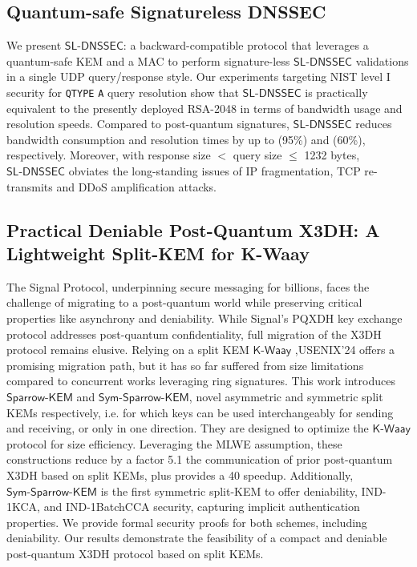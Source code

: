 \documentclass[11pt]{article}
\theoremstyle{definition}
\theoremstyle{remark}
\theoremstyle{plain}
\begin{document}
\subsection{\cite{10.1145/3708821.3710837} Quantum-safe Signatureless DNSSEC}
We present $\mathsf{SL \text{-} DNSSEC}$: a backward-compatible protocol that leverages a quantum-safe KEM and a MAC to perform signature-less $\mathsf{SL \text{-} DNSSEC}$ validations in a single UDP query/response style. Our experiments targeting NIST level I security for \texttt{QTYPE} \texttt{A} query resolution show that $\mathsf{SL \text{-} DNSSEC}$ is practically equivalent to the presently deployed RSA-2048 in terms of bandwidth usage and resolution speeds. Compared to post-quantum signatures, $\mathsf{SL \text{-} DNSSEC}$ reduces bandwidth consumption and resolution times by up to (95\%) and (60\%), respectively. Moreover, with response size $<$ query size $\le$ 1232 bytes, $\mathsf{SL \text{-} DNSSEC}$ obviates the long-standing issues of IP fragmentation, TCP re-transmits and DDoS amplification attacks.

\subsection{\cite{10.1145/3708821.3736192} Practical Deniable Post-Quantum X3DH: A Lightweight Split-KEM for K-Waay}
The Signal Protocol, underpinning secure messaging for billions, faces the challenge of migrating to a post-quantum world while preserving critical properties like asynchrony and deniability. While Signal's PQXDH key exchange protocol addresses post-quantum confidentiality, full migration of the X3DH protocol remains elusive. Relying on a split KEM $\mathsf{K\text{-}Waay}$ ,USENIX'24 \cite{collins2024k} offers a promising migration path, but it has so far suffered from size limitations compared to concurrent works leveraging ring signatures.
This work introduces $\mathsf{Sparrow \text{-} KEM}$ and $\mathsf{Sym \text{-} Sparrow \text{-}KEM}$, novel asymmetric and symmetric split KEMs respectively, i.e. for which keys can be used interchangeably for sending and receiving, or only in one direction. They are designed to optimize the $\mathsf{K\text{-}Waay}$ protocol for size efficiency. Leveraging the MLWE  assumption, these constructions reduce by a factor 5.1 \texttimes{} the communication of prior post-quantum X3DH based on split KEMs, plus provides a 40 \texttimes{} speedup. Additionally,$\mathsf{Sym\text{-}Sparrow\text{-}KEM}$ is the first symmetric split-KEM to offer deniability, IND-1KCA, and IND-1BatchCCA security, capturing implicit authentication properties. We provide formal security proofs for both schemes, including deniability. Our results demonstrate the feasibility of a compact and deniable post-quantum X3DH protocol based on split KEMs.
\end{document}
